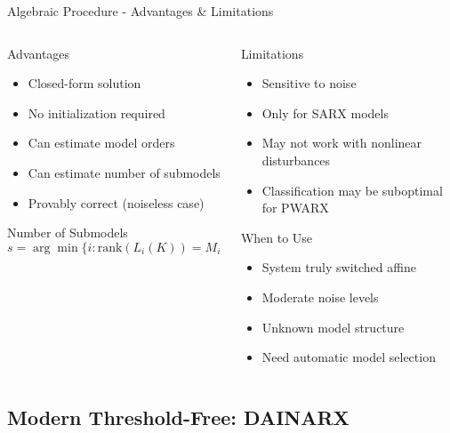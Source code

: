 \documentclass[aspectratio=169]{beamer}
\begin{document}
\begin{frame}{Algebraic Procedure - Advantages \& Limitations}
\begin{columns}[t]
\begin{column}{0.5\textwidth}
\begin{block}{Advantages}
\begin{itemize}
\item Closed-form solution
\item No initialization required
\item Can estimate model orders
\item Can estimate number of submodels
\item Provably correct (noiseless case)
\end{itemize}
\end{block}

\begin{exampleblock}{Number of Submodels}
$$s = \arg\min\{i : \text{rank}(L_i(K)) = M_i(K) - 1\}$$
\end{exampleblock}
\end{column}
\begin{column}{0.5\textwidth}
\begin{block}{Limitations}
\begin{itemize}
\item Sensitive to noise
\item Only for SARX models
\item May not work with nonlinear disturbances
\item Classification may be suboptimal for PWARX
\end{itemize}
\end{block}

\begin{alertblock}{When to Use}
\begin{itemize}
\item System truly switched affine
\item Moderate noise levels
\item Unknown model structure
\item Need automatic model selection
\end{itemize}
\end{alertblock}
\end{column}
\end{columns}
\end{frame}

\subsection{Modern Threshold-Free: DAINARX}
\end{document}
